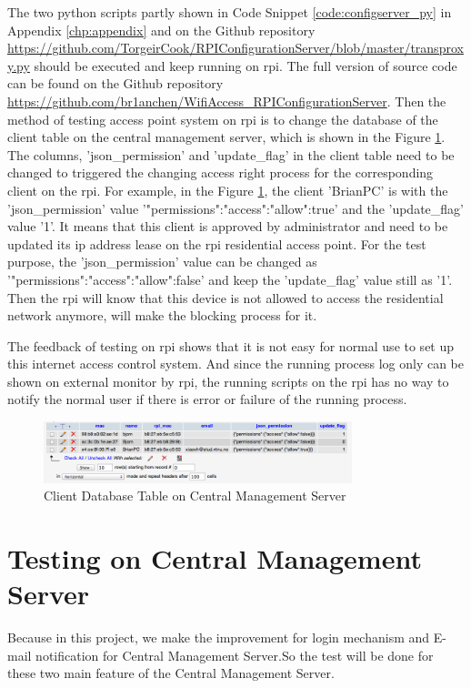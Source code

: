 \par The two python scripts partly shown in Code Snippet \ref{code:configserver_py} in Appendix \ref{chp:appendix} and on the Github repository \url{https://github.com/TorgeirCook/RPIConfigurationServer/blob/master/transproxy.py} should be executed and keep running on \gls{rpi}. The full version of source code can be found on the Github repository \url{https://github.com/br1anchen/WifiAccess_RPIConfigurationServer}. Then the method of testing access point system on \gls{rpi} is to change the database of the client table on the central management server, which is shown in the Figure \ref{fig:database_request}. The columns, 'json\_permission' and 'update\_flag' in the client table need to be changed to triggered the changing access right process for the corresponding client on the \gls{rpi}. For example, in the Figure \ref{fig:database_request}, the client 'BrianPC' is with the 'json\_permission' value '{"permissions":{"access":{"allow":true}}}' and the 'update\_flag' value '1'. It means that this client is approved by administrator and need to be updated its \gls{ip} address lease on the \gls{rpi} residential access point. For the test purpose, the 'json\_permission' value can be changed as '{"permissions":{"access":{"allow":false}}}' and keep the 'update\_flag' value still as '1'. Then the \gls{rpi} will know that this device is not allowed to access the residential network anymore, will make the blocking process for it.

\par The feedback of testing on \gls{rpi} shows that it is not easy for normal use to set up this internet access control system. And since the running process log only can be shown on external monitor by \gls{rpi}, the running scripts on the \gls{rpi} has no way to notify the normal user if there is error or failure of the running process.
\begin{figure}
	\centering
    	\includegraphics[width=0.80\textwidth,natwidth=610,natheight=642]{figs/database_request.png}
  	\caption{Client Database Table on Central Management Server}
  	\label{fig:database_request}
\end{figure}

\section{Testing on Central Management Server}
\par Because in this project, we make the improvement for login mechanism and E-mail notification for Central Management Server.So the test will be done for these two main feature of the Central Management Server.

